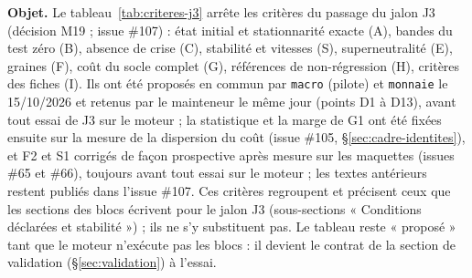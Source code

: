 \documentclass[11pt,a4paper]{article}
\begin{document}
\begin{proposee}
\textbf{Objet.} Le tableau~\ref{tab:criteres-j3} arrête les critères du passage du jalon J3 (décision M19 ; issue \#107) : état initial et stationnarité exacte (A), bandes du test zéro (B), absence de crise (C), stabilité et vitesses (S), superneutralité (E), graines (F), coût du socle complet (G), références de non-régression (H), critères des fiches (I). Ils ont été proposés en commun par \texttt{macro} (pilote) et \texttt{monnaie} le 15/10/2026 et retenus par le mainteneur le même jour (points D1 à D13), avant tout essai de J3 sur le moteur ; la statistique et la marge de G1 ont été fixées ensuite sur la mesure de la dispersion du coût (issue \#105, \S\ref{sec:cadre-identites}), et F2 et S1 corrigés de façon prospective après mesure sur les maquettes (issues \#65 et \#66), toujours avant tout essai sur le moteur ; les textes antérieurs restent publiés dans l'issue \#107. Ces critères regroupent et précisent ceux que les sections des blocs écrivent pour le jalon J3 (sous-sections « Conditions déclarées et stabilité ») ; ils ne s'y substituent pas. Le tableau reste « proposé » tant que le moteur n'exécute pas les blocs : il devient le contrat de la section de validation (\S\ref{sec:validation}) à l'essai.


\end{proposee}
\end{document}
